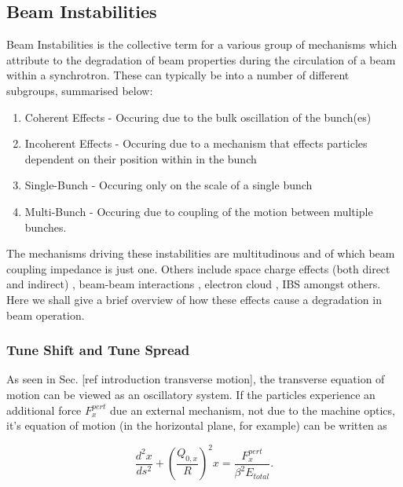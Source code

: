 \subsection{Beam Instabilities}

Beam Instabilities is the collective term for a various group of mechanisms which attribute to the degradation of beam properties during the circulation of a beam within a synchrotron. These can typically be into a number of different subgroups, summarised below:

\begin{enumerate}
\item{Coherent Effects - Occuring due to the bulk oscillation of the bunch(es)}
\item{Incoherent Effects - Occuring due to a mechanism that effects particles dependent on their position within in the bunch}
\item{Single-Bunch - Occuring only on the scale of a single bunch}
\item{Multi-Bunch - Occuring due to coupling of the motion between multiple bunches}.
\end{enumerate}

The mechanisms driving these instabilities are multitudinous and of which beam coupling impedance is just one. Others include space charge effects (both direct and indirect) \cite{Burov:TransInstabSC, Boine-Frankenheim:InstabSCRings}, beam-beam interactions \cite{Pieloni:PhDThesis}, electron cloud \cite{Li:ECloud}, IBS \cite{Schaumann:IBS, Mertens:IBSThesis} amongst others. Here we shall give a brief overview of how these effects cause a degradation in beam operation.

\subsubsection{Tune Shift and Tune Spread} 

As seen in Sec. [ref introduction transverse motion], the transverse equation of motion can be viewed as an oscillatory system. If the particles experience an additional force $ F^{pert}_{x}$ due an external mechanism, not due to the machine optics, it's equation of motion (in the horizontal plane, for example) can be written as

\begin{equation}
\frac{d^{2}x}{ds^{2}} + \left(\frac{Q_{0,x}}{R}\right)^{2} x = \frac{F^{pert}_{x}}{\beta^{2} E_{total}}.
\end{equation}

